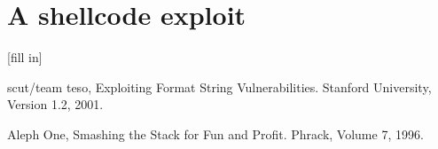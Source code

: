 \documentclass[12pt]{article}
\begin{document}
\appendix
\section{A shellcode exploit}
[fill in]

\begin{thebibliography}{9}

	scut/team teso,
	Exploiting Format String Vulnerabilities.
	Stanford University,
	Version 1.2,
	2001.

	Aleph One,
	Smashing the Stack for Fun and Profit.
	Phrack,
	Volume 7,
	1996.
\end{thebibliography}
\end{document}
